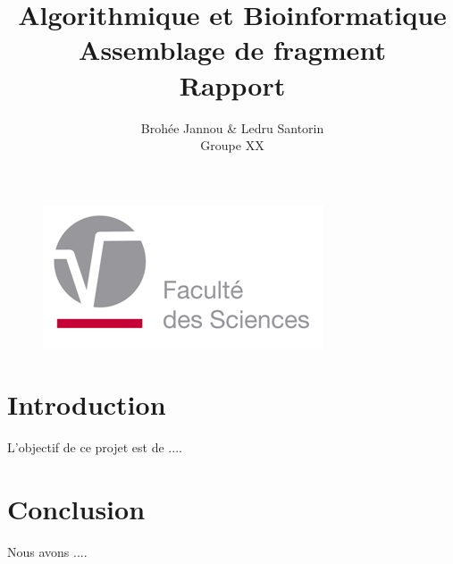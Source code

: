 \documentclass[a4paper]{article}
\begin{document}
\title{Algorithmique et Bioinformatique \\ Assemblage de fragment \\ Rapport}
\author{Broh\'ee Jannou \& Ledru Santorin  \\ Groupe XX}
\maketitle
\begin{figure}[!htb]
\begin{center}
  \includegraphics[width=\textwidth]{illustrations/UMONS_FS.jpg}
\end{center}
\end{figure}
\newpage
{}
\renewcommand{\contentsname}{Table des matières}
\tableofcontents

\newpage
{}
\section{Introduction}

\hspace{0.5cm}L'objectif de ce projet est de ....

\newpage
\section{Conclusion}

\hspace{0.5cm}Nous avons ....
\end{document}
